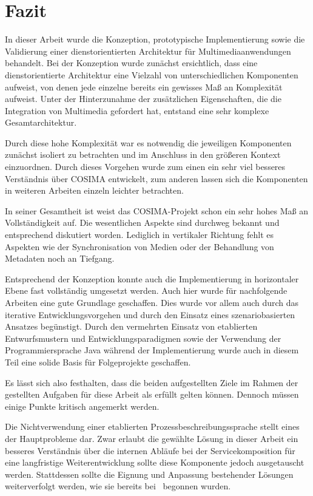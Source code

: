 \chapter{Fazit} %
\label{cha:fazit}

  In dieser Arbeit wurde die Konzeption, prototypische Implementierung sowie die Validierung einer dienstorientierten Architektur für Multimediaanwendungen behandelt. Bei der Konzeption wurde zunächst ersichtlich, dass eine dienstorientierte Architektur eine Vielzahl von unterschiedlichen Komponenten aufweist, von denen jede einzelne bereits ein gewisses Maß an Komplexität aufweist. Unter der Hinterzunahme der zusätzlichen Eigenschaften, die die Integration von Multimedia gefordert hat, entstand eine sehr komplexe Gesamtarchitektur.
  
  Durch diese hohe Komplexität war es notwendig die jeweiligen Komponenten zunächst isoliert zu betrachten und im Anschluss in den größeren Kontext einzuordnen. Durch dieses Vorgehen wurde zum einen ein sehr viel besseres Verständnis über COSIMA entwickelt, zum anderen lassen sich die Komponenten in weiteren Arbeiten einzeln leichter betrachten.
  
  In seiner Gesamtheit ist weist das COSIMA-Projekt schon ein sehr hohes Maß an Vollständigkeit auf. Die wesentlichen Aspekte sind durchweg bekannt und entsprechend diskutiert worden. Lediglich in vertikaler Richtung fehlt es Aspekten wie der Synchronisation von Medien oder der Behandlung von Metadaten noch an Tiefgang.
  
  Entsprechend der Konzeption konnte auch die Implementierung in horizontaler Ebene fast vollständig umgesetzt werden. Auch hier wurde für nachfolgende Arbeiten eine gute Grundlage geschaffen. Dies wurde vor allem auch durch das iterative Entwicklungsvorgehen und durch den Einsatz eines szenariobasierten Ansatzes begünstigt. Durch den vermehrten Einsatz von etablierten Entwurfsmustern und Entwicklungsparadigmen sowie der Verwendung der Programmiersprache Java während der Implementierung wurde auch in diesem Teil eine solide Basis für Folgeprojekte geschaffen.
  
  Es lässt sich also festhalten, dass die beiden aufgestellten Ziele im Rahmen der gestellten Aufgaben für diese Arbeit als erfüllt gelten können. Dennoch müssen einige Punkte kritisch angemerkt werden.
  
  Die Nichtverwendung einer etablierten Prozessbeschreibungssprache stellt eines der Hauptprobleme dar. Zwar erlaubt die gewählte Lösung in dieser Arbeit ein besseres Verständnis über die internen Abläufe bei der Servicekomposition für eine langfristige Weiterentwicklung sollte diese Komponente jedoch ausgetauscht werden. Stattdessen sollte die Eignung und Anpassung bestehender Lösungen weiterverfolgt werden, wie sie bereits bei~\citep{samma08} begonnen wurden.
  
